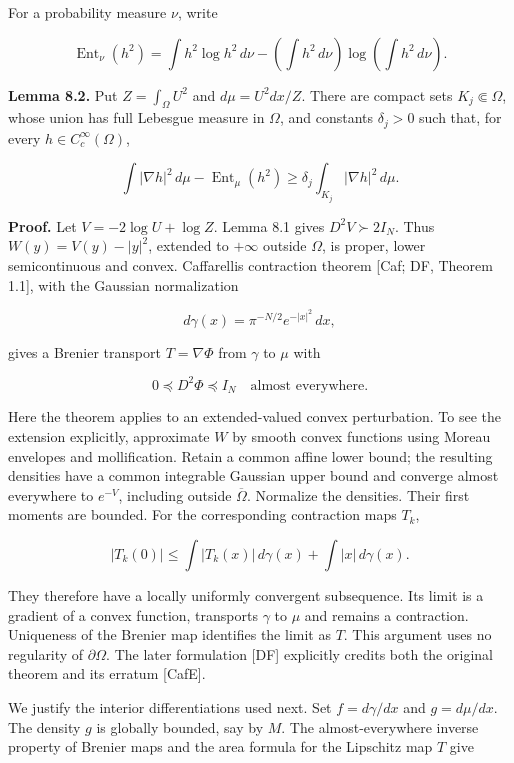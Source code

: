 \documentclass[11pt]{article}
\begin{document}
For a probability measure \(\nu\), write

\[\operatorname{Ent}_\nu(h^2)=\int h^2\log h^2\,d\nu-
\left(\int h^2\,d\nu\right)\log\left(\int h^2\,d\nu\right).\]

\textbf{Lemma 8.2.} Put \(Z=\int_\Omega U^2\) and \(d\mu=U^2dx/Z\).
There are compact sets \(K_j\Subset\Omega\), whose union has full
Lebesgue measure in \(\Omega\), and constants \(\delta_j>0\) such that,
for every \(h\in C_c^\infty(\Omega)\),

\[\int|\nabla h|^2\,d\mu-\operatorname{Ent}_\mu(h^2)
\geq\delta_j\int_{K_j}|\nabla h|^2\,d\mu.\tag{8.7}\]

\textbf{Proof.} Let \(V=-2\log U+\log Z\). Lemma 8.1 gives
\(D^2V\succ2I_N\). Thus \(W(y)=V(y)-|y|^2\), extended to \(+\infty\)
outside \(\Omega\), is proper, lower semicontinuous and convex.
Caffarelli\textquotesingle s contraction theorem {[}Caf; DF, Theorem
1.1{]}, with the Gaussian normalization

\[d\gamma(x)=\pi^{-N/2}e^{-|x|^2}\,dx,\]

gives a Brenier transport \(T=\nabla\Phi\) from \(\gamma\) to \(\mu\)
with

\[0\preceq D^2\Phi\preceq I_N\quad\text{almost everywhere}.\tag{8.8}\]

Here the theorem applies to an extended-valued convex perturbation. To
see the extension explicitly, approximate \(W\) by smooth convex
functions using Moreau envelopes and mollification. Retain a common
affine lower bound; the resulting densities have a common integrable
Gaussian upper bound and converge almost everywhere to \(e^{-V}\),
including outside \(\overline\Omega\). Normalize the densities. Their
first moments are bounded. For the corresponding contraction maps
\(T_k\),

\[|T_k(0)|\leq\int|T_k(x)|\,d\gamma(x)+\int|x|\,d\gamma(x).\]

They therefore have a locally uniformly convergent subsequence. Its
limit is a gradient of a convex function, transports \(\gamma\) to
\(\mu\) and remains a contraction. Uniqueness of the Brenier map
identifies the limit as \(T\). This argument uses no regularity of
\(\partial\Omega\). The later formulation {[}DF{]} explicitly credits
both the original theorem and its erratum {[}CafE{]}.

We justify the interior differentiations used next. Set \(f=d\gamma/dx\)
and \(g=d\mu/dx\). The density \(g\) is globally bounded, say by \(M\).
The almost-everywhere inverse property of Brenier maps and the area
formula for the Lipschitz map \(T\) give
\end{document}

